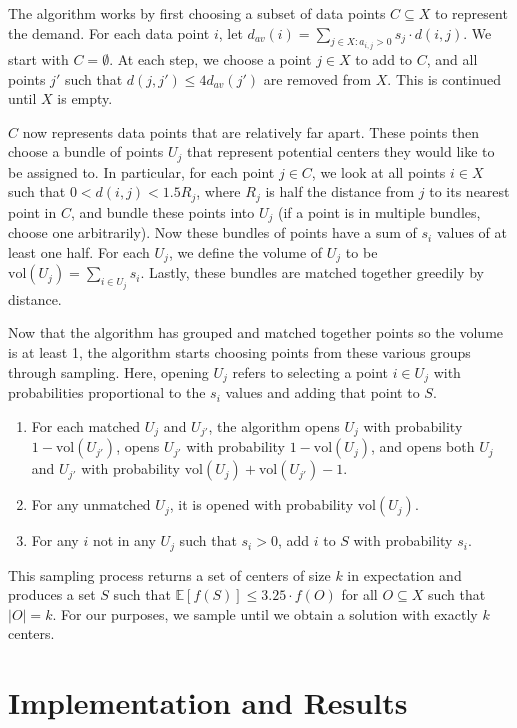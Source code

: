 \documentclass[conference, 10pt, final]{IEEEtran}
\begin{document}
The algorithm works by first choosing a subset of data points $C \subseteq X$ to represent the demand. For each data point $i$, let $d_{av}(i) = \sum_{j \in X : a_{i,j} > 0} s_j \cdot d(i,j)$. We start with $C = \emptyset$. At each step, we choose a point $j \in X$ to add to $C$, and all points $j'$ such that $d(j,j') \leq 4 d_{av}(j') $ are removed from $X$. This is continued until $X$ is empty. 

$C$ now represents data points that are relatively far apart. These points then choose a bundle of points $U_j$ that represent potential centers they would like to be assigned to. In particular, for each point $j \in C$, we look at all points $i \in X$ such that $0 < d(i,j) < 1.5 R_j$, where $R_j$ is half the distance from $j$ to its nearest point in $C$, and bundle these points into $U_j$ (if a point is in multiple bundles, choose one arbitrarily). Now these bundles of points have a sum of $s_i$ values of at least one half. For each $U_j$, we define the volume of $U_j$ to be $\mathrm{vol}(U_j) = \sum_{i \in U_j} s_i$. Lastly, these bundles are matched together greedily by distance. 

Now that the algorithm has grouped and matched together points so the volume is at least 1, the algorithm starts choosing points from these various groups through sampling. Here, opening $U_j$ refers to selecting a point $i \in U_j$ with probabilities proportional to the $s_i$ values and adding that point to $S$. 
\begin{enumerate}[\IEEEsetlabelwidth{3)}]
\item For each matched $U_j$ and $U_{j'}$, the algorithm opens $U_j$ with probability $1-\mathrm{vol}(U_{j'})$, opens $U_{j'}$ with probability $1- \mathrm{vol}(U_j)$, and opens both $U_{j}$ and $U_{j'}$ with probability $\mathrm{vol}(U_j) + \mathrm{vol}(U_{j'}) -1$. 
\item For any unmatched $U_j$, it is opened with probability $\mathrm{vol}(U_j)$.
\item For any $i$ not in any $U_j$ such that $s_i > 0$, add $i$ to $S$ with probability $s_i$. 
\end{enumerate}
This sampling process returns a set of centers of size $k$  in expectation and produces a set $S$ such that $\mathbb{E}[f(S)] \leq 3.25 \cdot f(O)$ for all $O \subseteq X$ such that $|O| = k$. For our purposes, we sample until we obtain a solution with exactly $k$ centers. 

\section{Implementation and Results}
\end{document}
